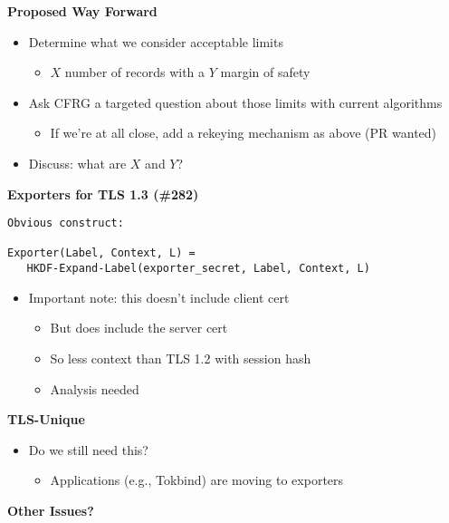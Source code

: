 \documentclass[helvetica]{seminar}
\newcommand{\heading}[1]{%
  \begin{center} 
    \large\bf 
    #1 
  \end{center} 
  \vspace{.4 in}}
\begin{document}
\begin{slide}
\heading{Proposed Way Forward}

\begin{itemize}
\item Determine what we consider acceptable limits
  \begin{itemize}
  \item $X$ number of records with a $Y$ margin of safety
  \end{itemize}

\item Ask CFRG a targeted question about those limits with current algorithms
  \begin{itemize}
  \item If we're at all close, add a rekeying mechanism as above (PR wanted)
  \end{itemize}

\item Discuss: what are $X$ and $Y$?
\end{itemize}
\end{slide}

\begin{slide}
\heading{Exporters for TLS 1.3 (\#282)}

\begin{scriptsize}
\begin{verbatim}
Obvious construct:

Exporter(Label, Context, L) = 
   HKDF-Expand-Label(exporter_secret, Label, Context, L)
\end{verbatim}
\end{scriptsize}

\begin{itemize}
\item Important note: this doesn't include client cert
  \begin{itemize}
  \item But does include the server cert
  \item So less context than TLS 1.2 with session hash
  \item Analysis needed
  \end{itemize}
\end{itemize}
\end{slide}


\begin{slide}
\heading{TLS-Unique}

\begin{itemize}
\item Do we still need this?
  \begin{itemize}
  \item Applications (e.g., Tokbind) are moving to exporters
  \end{itemize}
\end{itemize}
\end{slide}

\begin{slide}
\heading{Other Issues?}

\end{slide}
\end{document}
